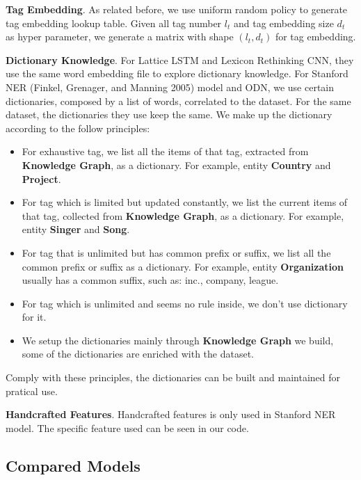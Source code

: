 \documentclass[letterpaper]{article} %
\begin{document}
\textbf{Tag Embedding}. As related before, we use uniform random policy to generate tag embedding lookup table. Given all tag number $l_t$ and tag embedding size $d_t$ as hyper parameter, we generate a matrix with shape $(l_t, d_t)$ for tag embedding.

\textbf{Dictionary Knowledge}. For Lattice LSTM and Lexicon Rethinking CNN, they use the same word embedding file to explore dictionary knowledge. For Stanford NER (Finkel, Grenager, and Manning 2005) model and ODN, we use certain dictionaries, composed by a list of words, correlated to the dataset. For the same dataset, the dictionaries they use keep the same. We make up the dictionary according to the follow principles:

\begin{itemize}
\item For exhaustive tag, we list all the items of that tag, extracted from \textbf{Knowledge Graph}, as a dictionary. For example, entity \textbf{Country} and \textbf{Project}.
\item For tag which is limited but updated constantly, we list the current items of that tag, collected from \textbf{Knowledge Graph}, as a dictionary. For example, entity \textbf{Singer} and \textbf{Song}.
\item For tag that is unlimited but has common prefix or suffix, we list all the common prefix or suffix as a dictionary. For example, entity \textbf{Organization} usually has a common suffix, such as: inc., company, league.
\item For tag which is unlimited and seems no rule inside, we don't use dictionary for it.
\item We setup the dictionaries mainly through \textbf{Knowledge Graph} we build, some of the dictionaries are enriched with the dataset.
\end{itemize}

Comply with these principles, the dictionaries can be built and maintained for pratical use.

\textbf{Handcrafted Features}. Handcrafted features is only used in Stanford NER model. The specific feature used can be seen in our code.




\subsection{Compared Models}
\end{document}
